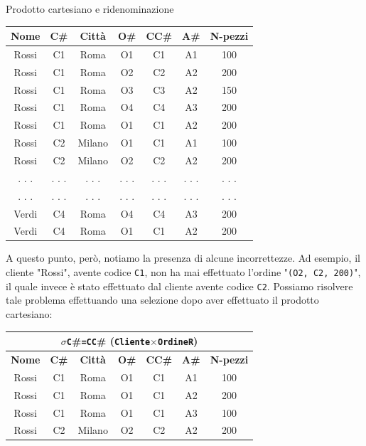 \begin{Example}{Prodotto cartesiano e ridenominazione}{}
\begin{center}
\begin{tabular}{|c|c|c|c|c|c|c|}
            \textbf{Nome} & \textbf{C\#} & \textbf{Città} & \textbf{O\#} & \textbf{CC\#} & \textbf{A\#} & \textbf{N-pezzi}\\\hline
            Rossi & C1 & Roma & O1 & C1 & A1 & 100\\
            Rossi & C1 & Roma & O2 & C2 & A2 & 200\\
            Rossi & C1 & Roma & O3 & C3 & A2 & 150\\
            Rossi & C1 & Roma & O4 & C4 & A3 & 200\\
            Rossi & C1 & Roma & O1 & C1 & A2 & 200\\
            Rossi & C2 & Milano & O1 & C1 & A1 & 100\\
            Rossi & C2 & Milano & O2 & C2 & A2 & 200\\
            . . . & . . . & . . . & . . . & . . . & . . . & . . .\\
            . . . & . . . & . . . & . . . & . . . & . . . & . . .\\
            Verdi & C4 & Roma & O4 & C4 & A3 & 200\\
            Verdi & C4 & Roma & O1 & C1 & A2 & 200\\\hline
        \end{tabular}
    \end{center}
    A questo punto, però, notiamo la presenza di alcune incorrettezze. Ad esempio, il cliente "Rossi", avente codice \verb|C1|, non ha mai effettuato l'ordine "\verb|(O2, C2, 200)|", il quale invece è stato effettuato dal cliente avente codice \verb|C2|. Possiamo risolvere tale problema effettuando una selezione dopo aver effettuato il prodotto cartesiano:
    \begin{center}
        \begin{tabular}{|c|c|c|c|c|c|c|}
            \hline\multicolumn{7}{|c|}{$\sigma$\scriptsize{\Verb|C|\#\Verb|=CC|\#} (\normalsize\Verb|Cliente|$\times$\Verb|OrdineR|)}\\\hline
            \textbf{Nome} & \textbf{C\#} & \textbf{Città} & \textbf{O\#} & \textbf{CC\#} & \textbf{A\#} & \textbf{N-pezzi}\\\hline
            Rossi & C1 & Roma & O1 & C1 & A1 & 100\\
            Rossi & C1 & Roma & O1 & C1 & A2 & 200\\
            Rossi & C1 & Roma & O1 & C1 & A3 & 100\\
            Rossi & C2 & Milano & O2 & C2 & A2 & 200\\

\end{tabular}
\end{center}
\end{Example}

